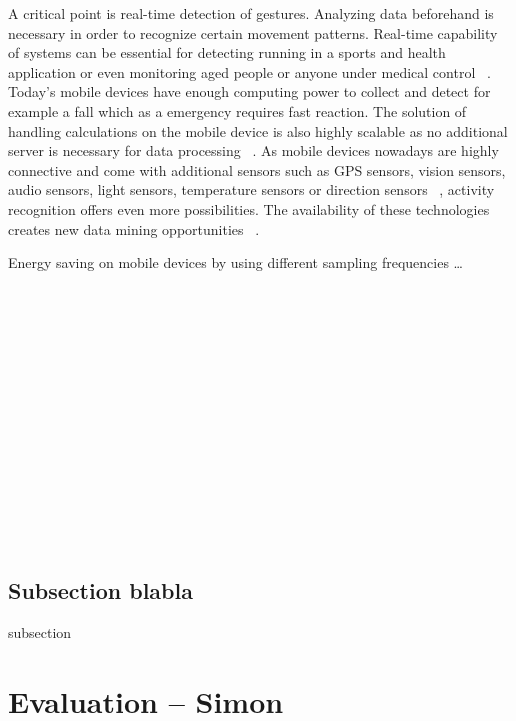 \documentclass[conference]{IEEEtran}
\begin{document}
A critical point is real-time detection of gestures. Analyzing data beforehand is necessary in order to recognize certain movement patterns. Real-time capability of systems can be essential for detecting running in a sports and health application or even monitoring aged people or anyone under medical control ~\cite{Brezmes2009}. Today's mobile devices have enough computing power to collect and detect for example a fall which as a emergency requires fast reaction. The solution of handling calculations on the mobile device is also highly scalable as no additional server is necessary for data processing ~\cite{Kwapisz2011}.
As mobile devices nowadays are highly connective and come with additional sensors such as GPS sensors, vision sensors, audio sensors, light sensors, temperature sensors or direction sensors ~\cite{Kwapisz2011}, activity recognition offers even more possibilities. The availability of these technologies creates new data mining opportunities ~\cite{Kwapisz2011}.

Energy saving on mobile devices by using different sampling frequencies \dots
\\
\\
\\
\\
\\
\\
\\
\\
\\
\\
\\
\\
\\
\\
\\
\subsection{Subsection blabla}
subsection
\newpage
\section{Evaluation -- Simon}
\end{document}

